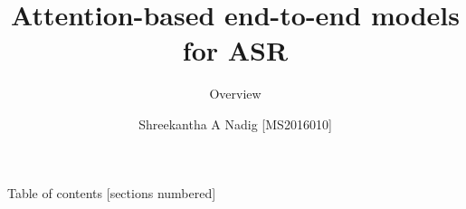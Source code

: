\documentclass[10pt]{beamer}
\title{Attention-based end-to-end models for ASR}
\subtitle{Overview}
\date{}
\author{Shreekantha A Nadig [MS2016010]}
\institute{Under the guidance of \\
	Prof. V.Ramasubramanian \\
	Prof. Sachit Rao}
\begin{document}
	
\maketitle

\begin{frame}{Table of contents}
[sections numbered]
\tableofcontents[hideallsubsections]
\end{frame}
\end{document}
